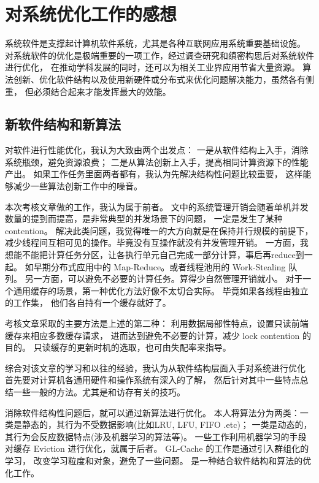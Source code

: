 \section{对系统优化工作的感想}

系统软件是支撑起计算机软件系统，尤其是各种互联网应用系统重要基础设施。
对系统软件的优化是极端重要的一项工作，经过调查研究和缜密构思后对系统软件进行优化，
在推动学科发展的同时，还可以为相关工业界应用节省大量资源。
算法创新、优化软件结构以及使用新硬件或分布式来优化问题解决能力，虽然各有侧重，
但必须结合起来才能发挥最大的效能。

\subsection{新软件结构和新算法}

对软件进行性能优化，我认为大致由两个出发点：
一是从软件结构上入手，消除系统瓶颈，避免资源浪费；
二是从算法创新上入手，提高相同计算资源下的性能产出。
如果工作任务里面两者都有，我认为先解决结构性问题比较重要，
这样能够减少一些算法创新工作中的噪音。

本次考核文章\cite{qiu_frozenhot_2023}做的工作，我认为属于前者。
文中的系统管理开销会随着单机并发数量的提到而提高，是非常典型的并发场景下的问题，
一定是发生了某种 contention。
解决此类问题，我觉得唯一的大方向就是在保持并行规模的前提下，
减少线程间互相可见的操作。毕竟没有互操作就没有并发管理开销。
一方面，我想能不能把计算任务分区，让各执行单元自己完成一部分计算，事后再reduce到一起。
如早期分布式应用中的 Map-Reduce。或者线程池用的 Work-Stealing 队列。
另一方面，可以避免不必要的计算任务。算得少自然管理开销就小。
对于一个通用缓存的场景，第一种优化方法好像不太切合实际。
毕竟如果各线程由独立的工作集，
他们各自持有一个缓存就好了。

考核文章采取的主要方法是上述的第二种：
利用数据局部性特点，设置只读前端缓存来相应多数缓存请求，
进而达到避免不必要的计算，减少 lock contention 的目的。
只读缓存的更新时机的选取，也可由失配率来指导。

综合对该文章的学习和以往的经验，我认为从软件结构层面入手对系统进行优化
首先要对计算机各通用硬件和操作系统有深入的了解，
然后针对其中一些特点总结一些一般的方法。尤其是和访存有关的技巧。

消除软件结构性问题后，就可以通过新算法进行优化。
本人将算法分为两类：一类是静态的，其行为不受数据影响(比如LRU, LFU, FIFO .etc)；
一类是动态的，其行为会反应数据特点(涉及机器学习的算法等)。
一些工作利用机器学习的手段对缓存 Eviction 进行优化，就属于后者。
GL-Cache 的工作是通过引入群组化的学习，
改变学习粒度和对象，避免了一些问题\cite{yang_gl-cache_nodate}。
是一种结合软件结构和算法的优化工作。


